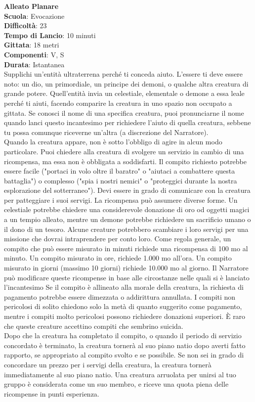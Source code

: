 \begin{multicols}{2}
\medskip\textbf{Alleato Planare}\\
\textbf{Scuola}: Evocazione\\
\textbf{Difficoltà}: 23\\
\textbf{Tempo di Lancio}: 10 minuti\\
\textbf{Gittata}: 18 metri\\
\textbf{Componenti}: V, S\\
\textbf{Durata}: Istantanea\\
Supplichi un'entità ultraterrena perché ti conceda aiuto. L'essere ti deve essere noto: un dio, un primordiale, un principe dei demoni, o qualche altra creatura di grande potere. Quell'entità invia un celestiale, elementale o demone a essa leale perché ti aiuti, facendo comparire la creatura in uno spazio non occupato a gittata. Se conosci il nome di una specifica creatura, puoi pronunciarne il nome quando lanci questo incantesimo per richiedere l'aiuto di quella creatura, sebbene tu possa comunque riceverne un'altra (a discrezione del Narratore).\\
Quando la creatura appare, non è sotto l'obbligo di agire in alcun modo particolare. Puoi chiedere alla creatura di svolgere un servizio in cambio di una ricompensa, ma essa non è obbligata a soddisfarti. Il compito richiesto potrebbe essere facile ("portaci in volo oltre il baratro" o "aiutaci a combattere questa battaglia") o complesso ("spia i nostri nemici" o "proteggici durante la nostra esplorazione del sotterraneo"). Devi essere in grado di comunicare con la creatura per patteggiare i suoi servigi. La ricompensa può assumere diverse forme. Un celestiale potrebbe chiedere una considerevole donazione di oro od oggetti magici a un tempio alleato, mentre un demone potrebbe richiedere un sacrificio umano o il dono di un tesoro. Alcune creature potrebbero scambiare i loro servigi per una missione che dovrai intraprendere per conto loro. Come regola generale, un compito che può essere misurato in minuti richiede una ricompensa di 100 mo al minuto. Un compito misurato in ore, richiede 1.000 mo all'ora. Un compito misurato in giorni (massimo 10 giorni) richiede 10.000 mo al giorno. Il Narratore può modificare queste ricompense in base alle circostanze nelle quali si è lanciato l'incantesimo Se il compito è allineato alla morale della creatura, la richiesta di pagamento potrebbe essere dimezzata o addirittura annullata. I compiti non pericolosi di solito chiedono solo la metà di quanto suggerito come pagamento, mentre i compiti molto pericolosi possono richiedere donazioni superiori. È raro che queste creature accettino compiti che sembrino suicida.\\
Dopo che la creatura ha completato il compito, o quando il periodo di servizio concordato è terminato, la creatura tornerà al suo piano natio dopo averti fatto rapporto, se appropriato al compito svolto e se possibile. Se non sei in grado di concordare un prezzo per i servigi della creatura, la creatura tornerà immediatamente al suo piano natio. Una creatura arruolata per unirsi al tuo gruppo è considerata come un suo membro, e riceve una quota piena delle ricompense in punti esperienza.


\end{multicols}
